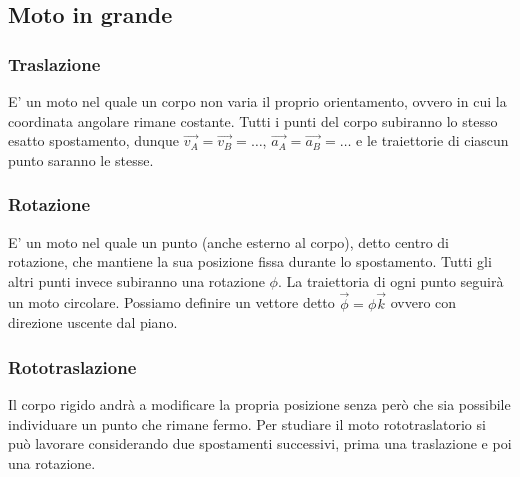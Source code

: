 \subsection{Moto in grande}
\subsubsection{Traslazione} 
E' un moto nel quale un corpo non varia il proprio orientamento, ovvero in cui la coordinata angolare rimane costante. Tutti i punti del corpo subiranno lo stesso esatto spostamento, dunque $\vec{v_A} = \vec{v_B} = \dots$, $\vec{a_A} = \vec{a_B} = \dots$ e le traiettorie di ciascun punto saranno le stesse.
\subsubsection{Rotazione} 
E' un moto nel quale un punto (anche esterno al corpo), detto centro di rotazione, che mantiene la sua posizione fissa durante lo spostamento. Tutti gli altri punti invece subiranno una rotazione $\phi$. La traiettoria di ogni punto seguirà un moto circolare. Possiamo definire un vettore detto $\vec{\phi} = \phi \vec{k}$ ovvero con direzione uscente dal piano.
\subsubsection{Rototraslazione}
Il corpo rigido andrà a modificare la propria posizione senza però che sia possibile individuare un punto che rimane fermo. Per studiare il moto rototraslatorio si può lavorare considerando due spostamenti successivi, prima una traslazione e poi una rotazione.
